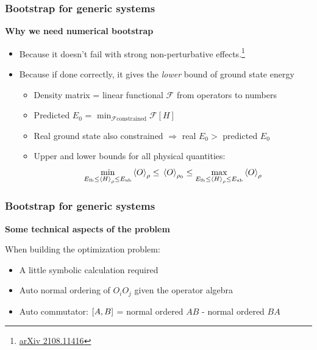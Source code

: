 \documentclass{beamer}
\begin{document}
\begin{frame}
\frametitle{Bootstrap for generic systems}

\textbf{Why we need numerical bootstrap}

\begin{itemize}
    \item Because it doesn't fail with strong non-perturbative effects.\footnote{\href{https://arxiv.org/abs/2108.11416}{arXiv 2108.11416}}
    \item Because if done correctly, it gives the \emph{lower} bound of ground state energy
    \begin{itemize}
        \item Density matrix = linear functional $\mathcal{F}$ from operators to numbers
        \item Predicted $E_0$ = $\min_{\mathcal{F} \text{constrained}} \mathcal{F}[H]$
        \item Real ground state also constrained $\Rightarrow$ real $E_0 > $ predicted $E_0$
        \item Upper and lower bounds for all physical quantities:
        \begin{equation}
            \min_{E_\text{lb} \leq \expval*{H}_\rho \leq E_\text{ub}} \expval{O}_\rho \leq \expval*{O}_{\rho_0} \leq \max_{E_\text{lb} \leq \expval*{H}_\rho \leq E_\text{ub}} \expval{O}_\rho
        \end{equation}
    \end{itemize}
\end{itemize}    

\end{frame}

\begin{frame}
\frametitle{Bootstrap for generic systems}

\textbf{Some technical aspects of the problem}

When building the optimization problem: 
\begin{itemize}
    \item A little symbolic calculation required
    \item Auto normal ordering of $O_i O_j$ given the operator algebra
    \item Auto commutator: $\comm{A}{B}$ = normal ordered $AB$ - normal ordered $BA$ 
\end{itemize}

\end{frame}
\end{document}
